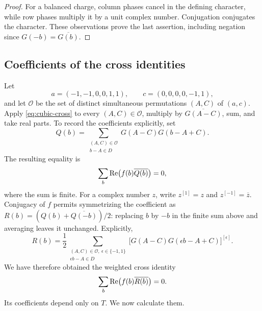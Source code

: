 \begin{proof}
For a balanced charge, column phases cancel in the defining
character, while row phases multiply it by a unit complex number.
Conjugation conjugates the character. These observations prove the
last assertion, including negation since $G(-b)=\overline{G(b)}$.
\end{proof}

\subsection{Coefficients of the cross identities}

Let
\[
 a=(-1,-1,0,0,1,1),\qquad c=(0,0,0,0,-1,1),
\]
and let $\mathcal O$ be the set of distinct simultaneous permutations
$(A,C)$ of $(a,c)$.
Apply \eqref{eq:cubic-cross} to every $(A,C)\in\mathcal O$, multiply
by $\overline{G(A-C)}$, sum, and take real parts. To record the
coefficients explicitly, set
\[
 Q(b)=\sum_{\substack{(A,C)\in\mathcal O\\b-A\in D}}
                 G(A-C)G(b-A+C).
\]
The resulting equality is
\[
 \sum_b\operatorname{Re}\bigl(f(b)\overline{Q(b)}\bigr)=0,
\]
where the sum is finite. For a complex number $z$, write
$z^{[1]}=z$ and $z^{[-1]}=\overline z$. Conjugacy of $f$ permits
symmetrizing the coefficient as
$R(b)=(Q(b)+\overline{Q(-b)})/2$: replacing $b$ by $-b$ in the finite
sum above and averaging leaves it unchanged. Explicitly,
\begin{equation}\label{eq:cubic-R}
 R(b)=\frac12
 \sum_{\substack{(A,C)\in\mathcal O,\ \epsilon\in\{-1,1\}\\
                  \epsilon b-A\in D}}
 \bigl[G(A-C)G(\epsilon b-A+C)\bigr]^{[\epsilon]}.
\end{equation}
We have therefore obtained the weighted cross identity
\begin{equation}\label{eq:cubic-weighted-cross}
 \sum_b\operatorname{Re}\bigl(f(b)\overline{R(b)}\bigr)=0.
\end{equation}
Its coefficients depend only on $T$. We now calculate them.

